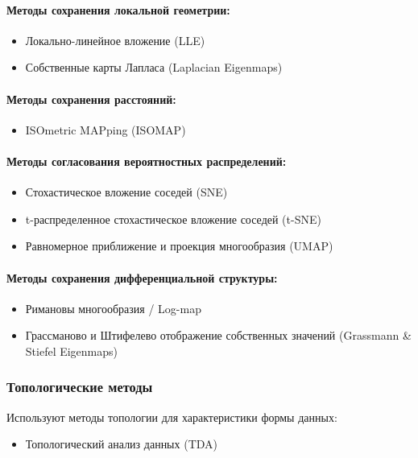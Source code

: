 \documentclass[a4paper,12pt]{article}
\begin{document}
\paragraph{Методы сохранения локальной геометрии:}
\begin{itemize}
    \item Локально-линейное вложение (LLE)
    \item Собственные карты Лапласа (Laplacian Eigenmaps)
\end{itemize}

\paragraph{Методы сохранения расстояний:}
\begin{itemize}
    \item ISOmetric MAPping (ISOMAP)
\end{itemize}

\paragraph{Методы согласования вероятностных распределений:}
\begin{itemize}
    \item Стохастическое вложение соседей (SNE)
    \item t-распределенное стохастическое вложение соседей (t-SNE)
    \item Равномерное приближение и проекция многообразия (UMAP)
\end{itemize}

\paragraph{Методы сохранения дифференциальной структуры:}
\begin{itemize}
    \item Римановы многообразия / Log-map
    \item Грассманово и Штифелево отображение собственных значений (Grassmann \& Stiefel Eigenmaps)
\end{itemize}

\subsubsection{Топологические методы}
Используют методы топологии для характеристики формы данных:
\begin{itemize}
    \item Топологический анализ данных (TDA)
\end{itemize}
\end{document}
